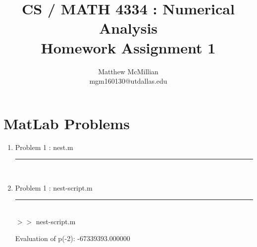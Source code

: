 \documentclass[12pt]{article}
\begin{document}
\title{CS / MATH 4334 : Numerical Analysis\\Homework Assignment 1}
\author{Matthew McMillian\\mgm160130@utdallas.edu}
\maketitle

\section*{MatLab Problems}


\pagebreak

	\begin{enumerate}
	
	\item[] Problem 1 : nest.m \noindent\rule{\textwidth}{1.0pt} \\
	
	
	\item[] Problem 1 : nest-script.m \noindent\rule{\textwidth}{1.0pt} \\
		
	
	$>>$ nest-script.m 
	\begin{framed}
	Evaluation of p(-2): -67339393.000000
	\end{framed}
	
	\end{enumerate}
	
\pagebreak	
	
\end{document}
